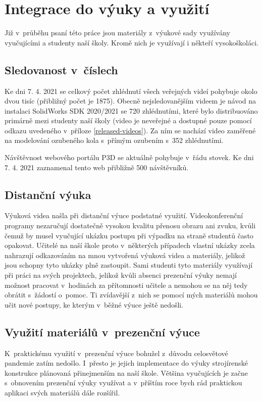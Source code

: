 \chapter{Integrace do výuky a využití}
Již v~průběhu psaní této práce jsou materiály z~výukové sady využívány vyučujícími a studenty naší školy.
Kromě nich je využívají i někteří vysokoškoláci.

\section{Sledovanost v~číslech}
Ke dni 7. 4. 2021 se celkový počet zhlédnutí všech veřejných videí pohybuje okolo dvou tisíc (přibližný počet je 1875).
Obecně nejsledovanějším videem je návod na instalaci SolidWorks SDK 2020/2021 se 720 zhlédnutími, které bylo distribuováno primárně mezi studenty naší školy (video je neveřejné a dostupné pouze pomocí odkazu uvedeného v~příloze \ref{released-videos}).
Za ním se nachází video zaměřené na modelování ozubeného kola s~přímým ozubením s~352 zhlédnutími.

Návštěvnost webového portálu P3D se aktuálně pohybuje v~řádu stovek.
Ke dni 7. 4. 2021 zaznamenal tento web přibližně 500 návštěvníků.

\section{Distanční výuka}
Výuková videa našla při distanční výuce podstatné využití.
Videokonferenční programy nezaručují dostatečně vysokou kvalitu přenosu obrazu ani zvuku, kvůli čemuž by musel vyučující ukázku postupu při výpadku na straně studentů často opakovat.
Učitelé na naší škole proto v~některých případech vlastní ukázky zcela nahrazují odkazováním na mnou vytvořená výuková videa a materiály, jelikož jsou schopny tyto ukázky plně zastoupit.
Sami studenti tyto materiály využívají při práci na svých projektech, jelikož kvůli absenci prezenční výuky nemají možnost pracovat v~hodinách za přítomnosti učitele a nemohou se na něj tedy obrátit s~žádostí o~pomoc.
Ti zvídavější z~nich se pomocí mých materiálů mohou učit nové postupy, ke kterým v~běžné výuce ještě nedošli.

\section{Využití materiálů v~prezenční výuce}
K~praktickému využití v~prezenční výuce bohužel z~důvodu celosvětové pandemie zatím nedošlo. 
I~přesto je jejich implementace do výuky strojírenské konstrukce plánovaná přinejmenším na naší škole.
Většina vyučujících je začne s~obnovením prezenční výuky využívat a v~příštím roce bych rád praktickou aplikaci svých materiálů dále rozšířil.


